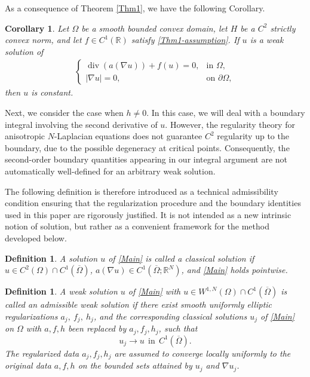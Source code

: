 \documentclass[10pt,a4paper]{amsart}
\numberwithin{equation}{section}
\newtheorem{cor}[thm]{Corollary}
\newtheorem{defn}[thm]{Definition}
\newcommand{\R}{\mathbb{R}}
\begin{document}
As a consequence of Theorem \ref{Thm1}, we have the following Corollary.

\begin{cor}\label{Thm5}
    Let $\Omega$ be a smooth bounded convex domain, let $H$ be a $C^2$ strictly convex norm, and let $f\in C^1(\R)$ satisfy \eqref{Thm1-assumption}.  If $u$ is a weak solution of
    \begin{align}\label{Thm5-equ}
        \begin{cases}
            \operatorname{div}(a(\nabla u))+f(u)=0, & \text{in }\Omega,\\
            |\nabla u|=0, & \text{on }\partial\Omega,
        \end{cases}
    \end{align}
    then $u$ is constant.
\end{cor}

Next, we consider the case when $h \neq 0$. In this case, we will deal with a boundary integral involving the second derivative of $u$. However, the regularity theory for anisotropic $N$-Laplacian equations does not guarantee $C^2$ regularity up to the boundary, due to the possible degeneracy at critical points. Consequently, the second-order boundary quantities appearing in our integral argument are not automatically well-defined for an arbitrary weak solution.

The following definition is therefore introduced as a technical admissibility condition ensuring that the regularization procedure and the boundary identities used in this paper are rigorously justified. It is not intended as a new intrinsic notion of solution, but rather as a convenient framework for the method developed below.


\begin{defn}\label{def:classicalRA}
A solution $u$ of \eqref{Main} is called a classical solution if $u\in C^2(\Omega)\cap C^1(\overline\Omega)$, $a(\nabla u)\in C^1(\overline\Omega;\R^N)$, and \eqref{Main} holds pointwise.
\end{defn}

\begin{defn}\label{def:weakRA}
A weak solution $u$ of \eqref{Main} with $u \in W^{1,N}(\Omega)\cap C^1(\overline\Omega) $ is called an admissible weak solution if there exist smooth uniformly elliptic regularizations $a_j,\ f_j,\ h_j$, and the corresponding classical solutions $u_j$ of \eqref{Main} on $\Omega$ with $a,f,h$ been replaced by $a_j,f_j,h_j$,  such that
\[
    u_j\longrightarrow u \ \ \text{in} \ \ C^1(\overline\Omega).
\]
The regularized data $a_j, f_j, h_j$ are assumed to converge locally uniformly to the original data $a,f,h$ on the bounded sets attained by $u_j$ and $\nabla u_j$.
\end{defn}
\end{document}
